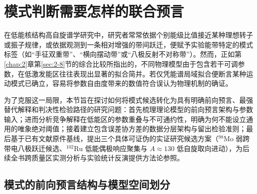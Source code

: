 \section{模式判断需要怎样的联合预言}\label{sec:3-8}

在低能核结构高自旋谱学研究中，研究者常常依据个别能级比值接近某种理想转子或振子规律，或依据观测到一条相对增强的带间跃迁，便赋予实验能带特定的模式标签（如“手征双重带”、“横向摆动带”或“八极反射不对称带”）。然而，正如第\ref{chap:2}章第\ref{sec:2-8}节的综合比较所指出的，不同物理模型由于包含若干可调参数，在低激发能区往往表现出显著的拟合简并。若仅凭能谱局域拟合便断言某种运动模式已确立，容易将参数自由度带来的数值符合误认为物理机制的确证。

为了克服这一局限，本节旨在探讨如何将模式候选转化为具有明确前向预言、最强替代解释和判决性检验路径的研究问题：首先梳理理论模型的前向预言架构与参数输入；进而分析竞争解释在低能区的参数重叠与不可通约性，明确为何不能设立通用的唯象绝对阈值；接着建立包含误差协方差的数据分层架构与留出检验准则；最后基于已有文献原件基线，提出三个具体可证伪的实证研究候选方案（$^{98}\mathrm{Mo}$ 弱跨带电八极跃迁候选、$^{102}\mathrm{Ru}$ 低能偶极响应聚集与 $A \approx 130$ 低自旋取向进动），为后续全书跨质量区实测分析与实验统计反演提供方法论参照。\cite{lawrie-2020-tilted-precession-wobbling,frauendorf-2014-transverse-wobbling,nomura-2022-questioning-wobbling-ibfm,lv-2022-evidence-against-wobbling-135pr,matta-2015-transverse-wobbling-135pr,karmakar-2026-98mo-octupole,saracino-2026-102ru-scissors-octupole-resonances}

\subsection{模式的前向预言结构与模型空间划分}\label{sec:3-8-1}

